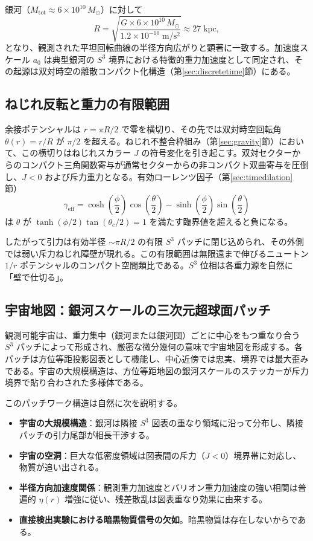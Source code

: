 \documentclass[a4paper]{article}
\begin{document}
銀河（$M_{\text{tot}} \approx 6 \times 10^{10}\,M_\odot$）に対して
\[
R = \sqrt{\frac{G \times 6 \times 10^{10}\,M_\odot}{1.2 \times 10^{-10}\;\mathrm{m/s^2}}} \approx 27\;\mathrm{kpc},
\]
となり、観測された平坦回転曲線の半径方向広がりと顕著に一致する。加速度スケール $a_0$ は典型銀河の $S^3$ 境界における特徴的重力加速度として同定され、その起源は双対時空の離散コンパクト化構造（第\ref{sec:discretetime}節）にある。

\subsection{ねじれ反転と重力の有限範囲}

余接ポテンシャルは $r = \pi R/2$ で零を横切り、その先では双対時空回転角 $\theta(r) = r/R$ が $\pi/2$ を超える。ねじれ不整合枠組み（第\ref{sec:gravity}節）において、この横切りはねじれスカラー $J$ の符号変化を引き起こす。双対セクターからのコンパクト三角関数寄与が通常セクターからの非コンパクト双曲寄与を圧倒し、$J < 0$ および斥力重力となる。有効ローレンツ因子（第\ref{sec:timedilation}節）
\[
\gamma_{\text{eff}} = \cosh\!\left(\frac{\phi}{2}\right)\cos\!\left(\frac{\theta}{2}\right) - \sinh\!\left(\frac{\phi}{2}\right)\sin\!\left(\frac{\theta}{2}\right)
\]
は $\theta$ が $\tanh(\phi/2)\tan(\theta_c/2) = 1$ を満たす臨界値を超えると負になる。

したがって引力は有効半径 $\sim \pi R/2$ の有限 $S^3$ パッチに閉じ込められ、その外側では弱い斥力ねじれ障壁が現れる。この有限範囲は無限遠まで伸びるニュートン $1/r$ ポテンシャルのコンパクト空間類比である。$S^3$ 位相は各重力源を自然に「壁で仕切る」。

\subsection{宇宙地図：銀河スケールの三次元超球面パッチ}

観測可能宇宙は、重力集中（銀河または銀河団）ごとに中心をもつ重なり合う $S^3$ パッチによって形成され、厳密な微分幾何の意味で宇宙地図を形成する。各パッチは方位等距投影図表として機能し、中心近傍では忠実、境界では最大歪みである。宇宙の大規模構造は、方位等距地図の銀河スケールのステッカーが斥力境界で貼り合わされた多様体である。

このパッチワーク構造は自然に次を説明する。
\begin{itemize}
  \item \textbf{宇宙の大規模構造}：銀河は隣接 $S^3$ 図表の重なり領域に沿って分布し、隣接パッチの引力尾部が相長干渉する。
  \item \textbf{宇宙の空洞}：巨大な低密度領域は図表間の斥力（$J < 0$）境界帯に対応し、物質が追い出される。
  \item \textbf{半径方向加速度関係}：観測重力加速度とバリオン重力加速度の強い相関は普遍的 $\eta(r)$ 増強に従い、残差散乱は図表重なり効果に由来する。
  \item \textbf{直接検出実験における暗黒物質信号の欠如}。暗黒物質は存在しないからである。
\end{itemize}
\end{document}
